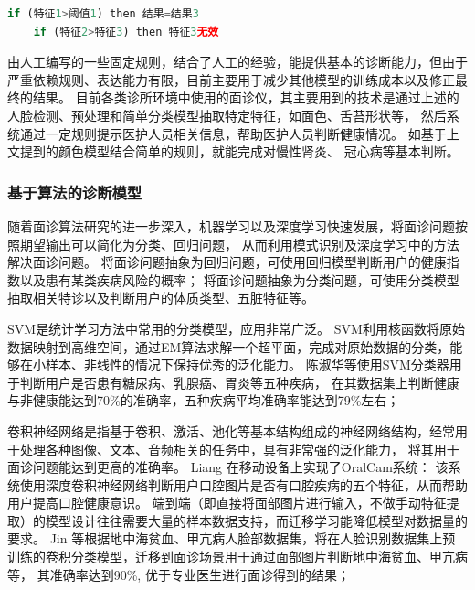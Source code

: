 \begin{lstlisting}[language={Python}, title=诊断规则]
    if (特征1>阈值1) then 结果=结果3
    if (特征2>特征3) then 特征3无效
\end{lstlisting}

由人工编写的一些固定规则，结合了人工的经验，能提供基本的诊断能力，但由于严重依赖规则、表达能力有限，目前主要用于减少其他模型的训练成本以及修正最终的结果。
目前各类诊所环境中使用的面诊仪，其主要用到的技术是通过上述的人脸检测、预处理和简单分类模型抽取特定特征，如面色、舌苔形状等，
然后系统通过一定规则提示医护人员相关信息，帮助医护人员判断健康情况。
如基于上文提到的颜色模型结合简单的规则，就能完成对慢性肾炎\cite{刘金涛2014基于数字化慢性肾炎湿热证面诊特征研究}、
冠心病\cite{陈聪2019冠心病痰瘀互结证面诊图像特征参数分析}等基本判断。

\subsubsection{基于算法的诊断模型}
随着面诊算法研究的进一步深入，机器学习以及深度学习快速发展，将面诊问题按照期望输出可以简化为分类、回归问题，
从而利用模式识别及深度学习中的方法解决面诊问题。
将面诊问题抽象为回归问题，可使用回归模型判断用户的健康指数以及患有某类疾病风险的概率；
将面诊问题抽象为分类问题，可使用分类模型抽取相关特诊以及判断用户的体质类型、五脏特征等。

SVM\cite{cortes1995support}是统计学习方法中常用的分类模型，应用非常广泛。
SVM利用核函数将原始数据映射到高维空间，通过EM算法求解一个超平面，完成对原始数据的分类，能够在小样本、非线性的情况下保持优秀的泛化能力。
陈淑华等\cite{陈淑华2016面部颜色空间分析及其在疾病诊断中的应用}使用SVM分类器用于判断用户是否患有糖尿病、乳腺癌、胃炎等五种疾病，
在其数据集上判断健康与非健康能达到70\%的准确率，五种疾病平均准确率能达到79\%左右；

卷积神经网络\cite{li2016survey}是指基于卷积、激活、池化等基本结构组成的神经网络结构，经常用于处理各种图像、文本、音频相关的任务中，具有非常强的泛化能力，
将其用于面诊问题能达到更高的准确率。
Liang\cite{liang2020oralcam} 在移动设备上实现了OralCam系统：
该系统使用深度卷积神经网络判断用户口腔图片是否有口腔疾病的五个特征，从而帮助用户提高口腔健康意识。
端到端（即直接将面部图片进行输入，不做手动特征提取）的模型设计往往需要大量的样本数据支持，而迁移学习能降低模型对数据量的要求。
Jin \cite{jin2020deep}等根据地中海贫血、甲亢病人脸部数据集，将在人脸识别数据集上预训练的卷积分类模型，迁移到面诊场景用于通过面部图片判断地中海贫血、甲亢病等，
其准确率达到90\%, 优于专业医生进行面诊得到的结果；


